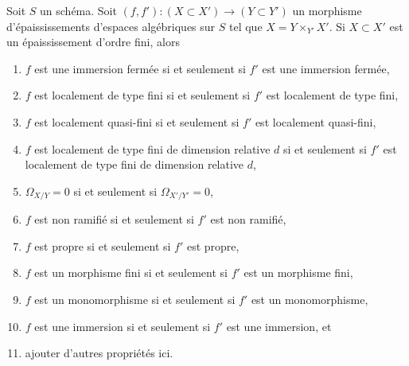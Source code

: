 \begin{lemma}
\label{lemma-thicken-property-morphisms-cartesian}
Soit $S$ un schéma. Soit $(f, f') : (X \subset X') \to (Y \subset Y')$ un
morphisme d'épaississements d'espaces algébriques sur $S$ tel que
$X = Y \times_{Y'} X'$. Si $X \subset X'$ est un épaississement d'ordre fini, alors
\begin{enumerate}
\item $f$ est une immersion fermée si et seulement si $f'$ est une immersion fermée,
\item $f$ est localement de type fini si et seulement si $f'$ est
localement de type fini,
\item $f$ est localement quasi-fini si et seulement si $f'$ est localement
quasi-fini,
\item $f$ est localement de type fini de dimension relative $d$ si et
seulement si $f'$ est localement de type fini de dimension relative $d$,
\item $\Omega_{X/Y} = 0$ si et seulement si $\Omega_{X'/Y'} = 0$,
\item $f$ est non ramifié si et seulement si $f'$ est non ramifié,
\item $f$ est propre si et seulement si $f'$ est propre,
\item $f$ est un morphisme fini si et seulement si $f'$ est un morphisme fini,
\item $f$ est un monomorphisme si et seulement si $f'$ est un monomorphisme,
\item $f$ est une immersion si et seulement si $f'$ est une immersion, et
\item ajouter d'autres propriétés ici.
\end{enumerate}
\end{lemma}

